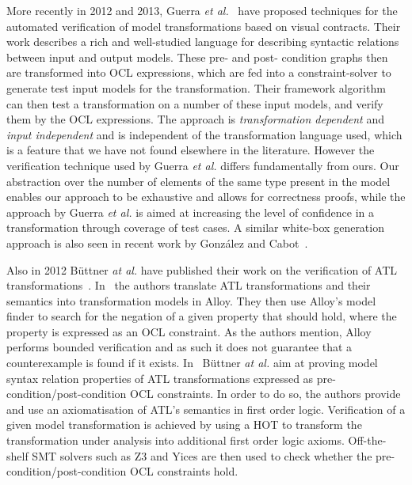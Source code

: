 More recently in 2012 and 2013, Guerra \emph{et al.}~\cite{guerra2013specification} have proposed techniques for the automated verification of model transformations based on visual contracts. Their work describes a rich and well-studied language for describing syntactic relations between input and output models. These pre- and post- condition graphs then are transformed into OCL expressions, which are fed into a constraint-solver to generate test input models for the transformation. Their framework algorithm can then test a transformation on a number of these input models, and verify them by the OCL expressions. The approach is \emph{transformation dependent} and \emph{input independent} and is independent of the transformation language used, which is a feature that we have not found elsewhere in the literature. However the verification technique used by Guerra \emph{et al.} differs fundamentally from ours. Our abstraction over the number of elements of the same type present in the model enables our approach to be exhaustive and allows for correctness proofs, while the approach by Guerra \emph{et al.} is aimed at increasing the level of confidence in a transformation through coverage of test cases. A similar white-box generation approach is also seen in recent work by Gonz{\'a}lez and Cabot~\cite{gonzalez2012atltest}.


Also in 2012 B\"uttner \emph{at al.} have published their work on the verification of ATL transformations~\cite{ButtnerECG12,ButtnerEC12}. In~\cite{ButtnerECG12} the authors translate ATL transformations and their semantics into transformation models in Alloy. They then use Alloy's model finder to search for the negation of a given property that should hold, where the property is expressed as an OCL constraint. As the authors mention, Alloy performs bounded verification and as such it does not guarantee that a counterexample is found if it exists. In~\cite{ButtnerEC12} B\"uttner \emph{at al.} aim at proving model syntax relation properties of ATL transformations expressed as pre-condition/post-condition OCL constraints. In order to do so, the authors provide and use an axiomatisation of ATL's semantics in first order logic. Verification of a given model transformation is achieved by using a HOT to transform the transformation under analysis into additional first order logic axioms. Off-the-shelf SMT solvers such as Z3 and Yices are then used to check whether the pre-condition/post-condition OCL constraints hold.

